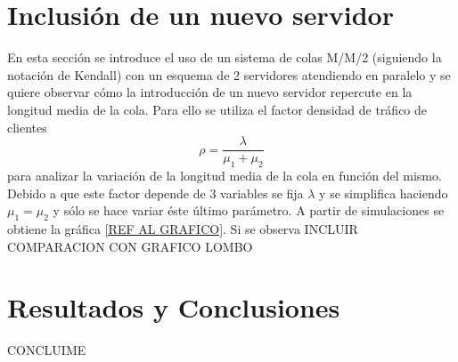 \documentclass{sig-alternate}
\begin{document}
\section{Inclusi\'on de un nuevo servidor}
\label{sec:mm2}

En esta secci\'on se introduce el uso de un sistema de colas M/M/2 (siguiendo la notación de Kendall) con un esquema de 2 servidores atendiendo en paralelo y se quiere observar c\'omo la introducci\'on de un nuevo servidor repercute en la longitud media de la cola. Para ello se utiliza el factor densidad de tr\'afico de clientes
\begin{equation}
\rho = \frac{\lambda}{\mu_{1} + \mu_{2}}
\end{equation}
para analizar la variaci\'on de la longitud media de la cola en funci\'on del mismo. Debido a que este factor depende de 3 variables se fija $\lambda$ y se simplifica haciendo $\mu_{1}=\mu_{2}$ y sólo se hace variar \'este \'ultimo par\'ametro. A partir de simulaciones se obtiene la gr\'afica \ref{REF AL GRAFICO}. Si se observa {INCLUIR COMPARACION CON GRAFICO LOMBO}

\section{Resultados y Conclusiones}
\label{sec:conclusiones}
CONCLUIME

\end{document}
